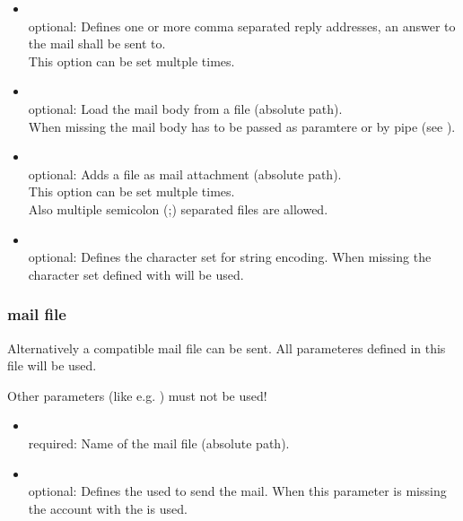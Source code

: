 \begin {itemize}
  \item [\var{-r},]  
    \\optional: Defines one or more comma separated reply addresses,
    an answer to the mail shall be sent to.
    \\ This option can be set multple times.

  \item [\var{-B},]  
    \\optional: Load the mail body from a file  (absolute path).
    \\When missing the mail body has to be passed as paramtere or by pipe 
    (see ).

  \item [\var{-a},]  
    \\optional: Adds a file as mail attachment (absolute path).
    \\ This option can be set multple times.
    \\ Also multiple semicolon (;) separated files are allowed.
  
  \item [\var{-C},]  
    \\optional: Defines the character set for string encoding.
    When missing the character set defined with  
     will be used.
\end{itemize}

\subsubsection{ mail file}
    Alternatively a  compatible
    mail file can be sent. All parameteres defined in this file will be used. 
    
    Other parameters (like e.g. ) must not be used!  

\begin {itemize}
  \item [\var{-m},]  
    \\required: Name of the mail file (absolute path).
  
  \item [\var{-A},]  
    \\optional: Defines the 
    used to send the mail. When this parameter is missing the account
    with the   is used.
\end{itemize}

